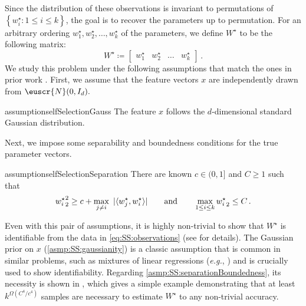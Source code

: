 \documentclass[11pt,letterpaper]{article}
\theoremstyle{plain}
\theoremstyle{definition}
\theoremstyle{remark}
\newcommand{\qquadtext}[1]{\qquad\text{#1}\qquad}
\newcommand{\qquadand}{\qquadtext{and}}
\def\sabs#1{| #1 |}
\newcommand{\inbrace}[1]{\ensuremath{\left\{#1\right\}}}
\newcommand{\sinangle}[1]{\ensuremath{\langle#1\rangle}}
\newcommand{\inparen}[1]{\ensuremath{\left(#1\right)}}
\let\norm\relax
\newcommand{\norm}[1]{\ensuremath{\left\lVert #1 \right\rVert}}
\newcommand{\sfrac}[2]{{#1/#2}}
\newcommand{\customcal}[1]{\euscr{#1}}
\newcommand{\cN}{\customcal{N}}
\newcommand{\eg}{\emph{e.g.}}
\newcommand{\Wstar}{{W^\star}}
\begin{document}
{\begin{figure}[tbh!]
{        }
    \end{figure}  
    Since the distribution of these observations is invariant to permutations of  $\inbrace{w^\star_i\colon 1\leq i\leq k}$, the goal is to recover the parameters up to permutation.
    For an arbitrary ordering $w^\star_1,w^\star_2,\dots,w^\star_k$ of the parameters, we define $\Wstar$ to be the following matrix:
    \[
        \Wstar \coloneqq \begin{bmatrix}
            w^\star_1 & w^\star_2 & \dots & w^\star_k
        \end{bmatrix}\,.
    \]
    We study this problem under the following assumptions that match the ones in prior work \cite{cherapanamjeri2023selfselection,gaitonde2024selfselection}. First, we assume that the feature vectors $x$ are independently drawn from $\cN(0,I_{d}).$
    \begin{restatable}[Gaussianity]{assumption}{selfSelectionGauss}\label{asmp:SS:gaussianity}
        The feature $x$ follows the $d$-dimensional standard Gaussian distribution. 
    \end{restatable} 
    Next, we impose some separability  and boundedness conditions for the true parameter vectors.
    \begin{restatable}{assumption}{selfSelectionSeparation}\label{asmp:SS:separationBoundedness}
        There are known $c\in (0,1]$ and $C\geq 1$ such that 
        \[
            \norm{w^\star_i}_2^2 
            \geq c + \max_{j\neq i}~\sabs{\sinangle{w^\star_j, w^\star_i}} 
            \qquadand
            \max_{1\leq i\leq k}\norm{w^\star_i}_2 \leq C\,.
        \]
    \end{restatable} 

    \noindent Even with this pair of assumptions, it is highly non-trivial to show that $\Wstar$ is identifiable from the data in \cref{eq:SS:observations} (see \cite{cherapanamjeri2023selfselection}for details).
    The Gaussian prior on $x$ (\cref{asmp:SS:gaussianity}) is a classic assumption that is common in similar problems, such as mixtures of linear regressions (\eg{}, \cite{silvia2020EMmixtures}) and is crucially used to show identifiability. 
    Regarding \cref{asmp:SS:separationBoundedness}, 
    its necessity is shown in \cite[Remark 6.1]{gaitonde2024selfselection},
    which gives a simple example demonstrating that at least $k^{\Omega\inparen{\sfrac{C^4}{c^4}}}$ samples are necessary to estimate $W^\star$ to any non-trivial accuracy.

}
\end{document}
